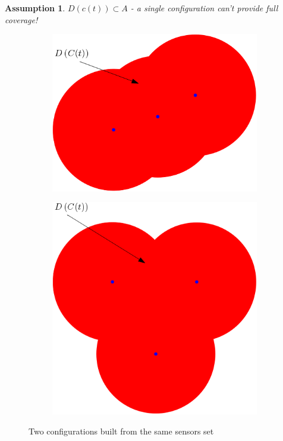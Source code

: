 \documentclass{iacas}
\newtheorem{assumption}{Assumption}
\begin{document}
\begin{assumption}
$D\left( c\left( t \right) \right) \subset A$ - a single configuration \emph{can't} provide full coverage!
\end{assumption}

\begin{figure}[H]
\centering
	\begin{subfigure}[b]{0.3\textwidth}
		\includegraphics[width=\textwidth]{figures/problem-def/config-1.png}
	\end{subfigure}
	\hspace{0.75cm}
	\vline
	\hspace{0.75cm}
	\begin{subfigure}[b]{0.3\textwidth}
		\includegraphics[width=\textwidth]{figures/problem-def/config-2.png}
	\end{subfigure}
	\caption{Two configurations built from the same sensors set}
	\label{fig:configurationsExample}
\end{figure}
\end{document}
